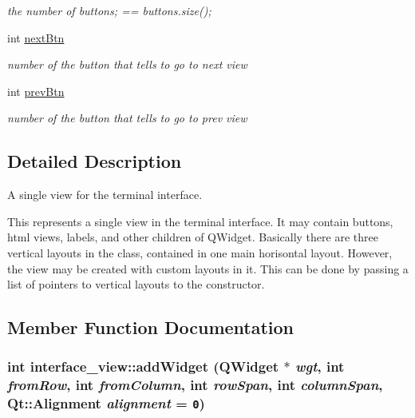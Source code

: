 \begin{CompactItemize}
\begin{CompactList}\small\item\em the number of buttons; == buttons.size(); \item\end{CompactList}\item 
\hypertarget{classinterface__view_587114c739e5bfe63f79daa4653fb91d}{
int \hyperlink{classinterface__view_587114c739e5bfe63f79daa4653fb91d}{nextBtn}}
\label{classinterface__view_587114c739e5bfe63f79daa4653fb91d}

\begin{CompactList}\small\item\em number of the button that tells to go to next view \item\end{CompactList}\item 
\hypertarget{classinterface__view_6f99c38583db8aaf39bd52034ad56b50}{
int \hyperlink{classinterface__view_6f99c38583db8aaf39bd52034ad56b50}{prevBtn}}
\label{classinterface__view_6f99c38583db8aaf39bd52034ad56b50}

\begin{CompactList}\small\item\em number of the button that tells to go to prev view \item\end{CompactList}\end{CompactItemize}


\subsection{Detailed Description}
A single view for the terminal interface. 

This represents a single view in the terminal interface. It may contain buttons, html views, labels, and other children of QWidget. Basically there are three vertical layouts in the class, contained in one main horisontal layout. However, the view may be created with custom layouts in it. This can be done by passing a list of pointers to vertical layouts to the constructor. 

\subsection{Member Function Documentation}
\hypertarget{classinterface__view_55fe3b79d276a6a477c2e1e5058cf52c}{
\subsubsection[{addWidget}]{\setlength{\rightskip}{0pt plus 5cm}int interface\_\-view::addWidget (QWidget $\ast$ {\em wgt}, \/  int {\em fromRow}, \/  int {\em fromColumn}, \/  int {\em rowSpan}, \/  int {\em columnSpan}, \/  Qt::Alignment {\em alignment} = {\tt 0})}}
\label{classinterface__view_55fe3b79d276a6a477c2e1e5058cf52c}


